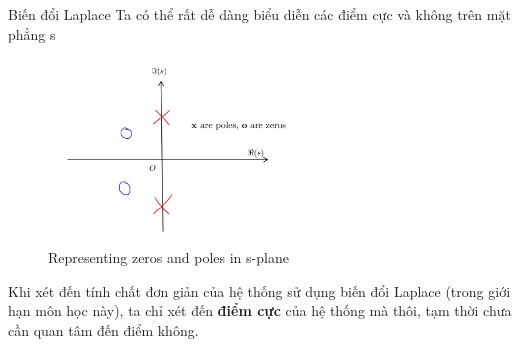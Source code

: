 \documentclass[8pt]{beamer}
\begin{document}
\begin{frame}{Biến đổi Laplace}
Ta có thể rất dễ dàng biểu diễn các điểm cực và không trên mặt phẳng s
\begin{figure}[h]
			\includegraphics[width=0.6\textwidth]{zero.jpg}
			\caption{Representing zeros and poles in s-plane}\label{fig:re3}

		\end{figure}
		Khi xét đến tính chất đơn giản của hệ thống sử dụng biến đổi Laplace (trong giới hạn môn học này), ta chỉ xét đến \textbf{\alert{điểm cực}} của hệ thống mà thôi, tạm thời chưa cần quan tâm đến điểm không.
\end{frame}
\end{document}
